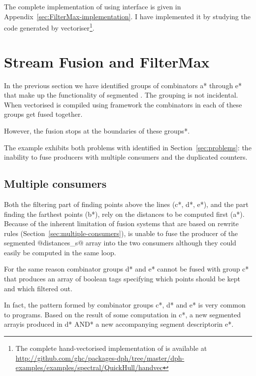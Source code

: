 \documentclass[preamble.tex]{subfiles}
\begin{document}
The complete implementation of \FilterMax using \LiveFusion interface is given in Appendix~\ref{sec:FilterMax-implementation}. I have implemented it by studying the  code generated by \DPH vectoriser\footnote{The complete hand-vectorised implementation of \QuickHull is available at \url{http://github.com/ghc/packages-dph/tree/master/dph-examples/examples/spectral/QuickHull/handvec}}.



\section{Stream Fusion and FilterMax}

In the previous section we have identified groups of combinators \*a* through \*e* that make up the functionality of segmented \FilterMax. The grouping is not incidental. When vectorised \QuickHull is compiled using \StreamFusion framework the combinators in each of these groups get fused together.

However, \*the fusion stops at the boundaries of these groups*.

The \FilterMax example exhibits both problems with \StreamFusion identified in Section~\ref{sec:problems}: the inability to fuse producers with multiple consumers and the duplicated counters.


\subsection{Multiple consumers}

Both the filtering part of \FilterMax finding points above the lines (\*c*, \*d*, \*e*), and the part finding the farthest points (\*b*), rely on the distances to be computed first (\*a*). Because of the inherent limitation of fusion systems that are based on rewrite rules (Section~\ref{sec:multiple-consumers}), \StreamFusion is unable to fuse the producer of the segmented @distances_s@ array into the two consumers although they could easily be computed in the same loop.

For the same reason combinator groups \*d* and \*e* cannot be fused with group \*c* that produces an array of boolean tags specifying which points should be kept and which filtered out.

\begin{bluebox}
In fact, the pattern formed by combinator groups \*c*, \*d* and \*e* is very common to \DPH programs. Based on the result of some computation in \*c*, a new segmented array\isegarray is produced in \*d* \*AND* a new accompanying segment descriptor\isegd in \*e*.
\end{bluebox}
\end{document}
